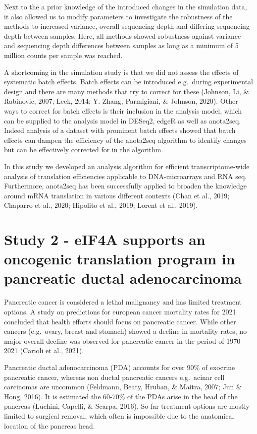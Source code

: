 \documentclass[
  12pt,
  openany]{book}
\begin{document}
Next to the a prior knowledge of the introduced changes in the simulation data, it also allowed us to modify parameters to investigate the robustness of the methods to increased variance, overall sequencing depth and differing sequencing depth between samples. Here, all methods showed robustness against variance and sequencing depth differences between samples as long as a minimum of 5 million counts per sample was reached.

A shortcoming in the simulation study is that we did not assess the effects of systematic batch effects. Batch effects can be introduced e.g.~during experimental design and there are many methods that try to correct for these (Johnson, Li, \& Rabinovic, 2007; Leek, 2014; Y. Zhang, Parmigiani, \& Johnson, 2020). Other ways to correct for batch effects is their inclusion in the analysis model, which can be supplied to the analysis model in DESeq2, edgeR as well as anota2seq. Indeed analysis of a dataset with prominent batch effects showed that batch effects can dampen the efficiency of the anota2seq algorithm to identify changes but can be effectively corrected for in the algorithm.

In this study we developed an analysis algorithm for efficient transcriptome-wide analysis of translation efficiencies applicable to DNA-microarrays and RNA seq. Furthermore, anota2seq has been successfully applied to broaden the knowledge around mRNA translation in various different contexts (Chan et al., 2019; Chaparro et al., 2020; Hipolito et al., 2019; Lorent et al., 2019).
\newline

\section{Study 2 - eIF4A supports an oncogenic translation program in pancreatic ductal adenocarcinoma}

Pancreatic cancer is considered a lethal malignancy and has limited treatment options. A study on predictions for european cancer mortality rates for 2021 concluded that health efforts should focus on pancreatic cancer. While other cancers (e.g.~ovary, breast and stomach) showed a decline in mortality rates, no major overall decline was observed for pancreatic cancer in the period of 1970-2021 (Carioli et al., 2021).

Pancreatic ductal adenocarcinoma (PDA) accounts for over 90\% of exocrine pancreatic cancer, whereas non ductal pancreatic cancers e.g.~acinar cell carcinomas are uncommon (Feldmann, Beaty, Hruban, \& Maitra, 2007; Jun \& Hong, 2016). It is estimated the 60-70\% of the PDAs arise in the head of the pancreas (Luchini, Capelli, \& Scarpa, 2016). So far treatment options are mostly limited to surgical removal, which often is impossible due to the anatomical location of the pancreas head.
\end{document}
